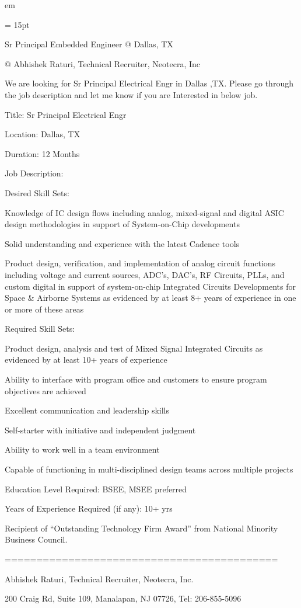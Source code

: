 

 em

\FFrg \baselineskip = 15pt



\centerline{
Sr Principal Embedded Engineer @ Dallas, TX 
} 
\centerline{
@  Abhishek Raturi, Technical Recruiter, Neotecra, Inc
} 

\par We are looking for Sr Principal Electrical Engr   in Dallas ,TX. Please go through the job description and let me know if you are Interested in below job.
\par Title: Sr Principal Electrical Engr
\par Location: Dallas, TX
\par Duration: 12 Months
\par Job Description:
\par Desired Skill Sets:
\par * Knowledge of IC design flows including analog, mixed-signal and digital ASIC design methodologies in support of System-on-Chip developments
\par * Solid understanding and experience with the latest Cadence tools
\par * Product design, verification, and implementation of analog circuit functions including voltage and current sources, ADC’s, DAC’s, RF Circuits, PLLs, and custom digital in support of system-on-chip Integrated Circuits Developments for Space \& Airborne Systems as evidenced by at least 8+ years of experience in one or more of these areas
\par * Required Skill Sets:
\par * Product design, analysis and test of Mixed Signal Integrated Circuits as evidenced by at least 10+ years of experience
\par * Ability to interface with program office and customers to ensure program objectives are achieved
\par * Excellent communication and leadership skills
\par * Self-starter with initiative and independent judgment
\par * Ability to work well in a team environment
\par * Capable of functioning in multi-disciplined design teams across multiple projects
\par * Education Level Required: BSEE, MSEE preferred 
\par * Years of Experience Required (if any): 10+ yrs 
\par Recipient of “Outstanding Technology Firm Award” from National Minority Business Council.
\par ===========================================
\par Abhishek Raturi, Technical Recruiter, Neotecra, Inc.
\par 200 Craig Rd, Suite 109, Manalapan, NJ 07726, Tel: 206-855-5096

\bye
